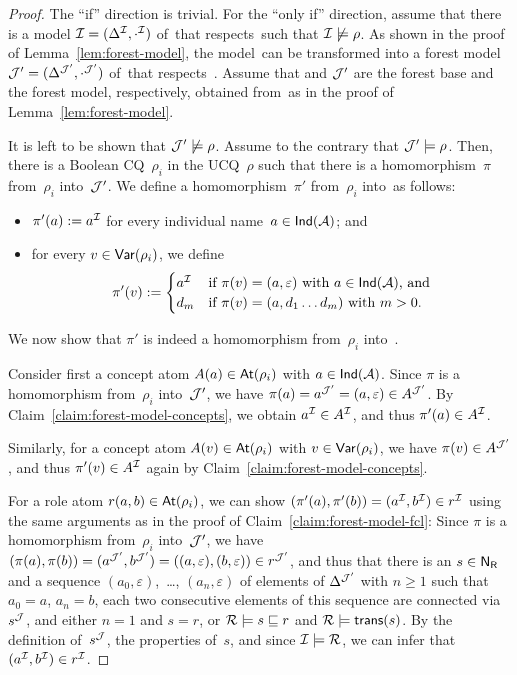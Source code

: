 \begin{proof}
    The \enquote{if} direction is trivial.  For the \enquote{only if} direction,
    assume that there is a model $\mathcal{I}=(\Delta^\mathcal{I},\cdot^\mathcal{I})$ of~\Kmc that
    respects~\Dmc such that $\mathcal{I}\not\models\rho$.  As shown in the proof of
    Lemma~\ref{lem:forest-model}, the model~\Imc can be transformed into a
    forest model $\mathcal{J}'=(\Delta^{\mathcal{J}'},\cdot^{\mathcal{J}'})$ of~\Kmc that
    respects~\Dmc.
    Assume that \Jmc and $\mathcal{J}'$ are the forest base and the forest model,
    respectively, obtained from~\Imc as in the proof of
    Lemma~\ref{lem:forest-model}.

    It is left to be shown that $\mathcal{J}'\not\models\rho$.  Assume to the contrary
    that $\mathcal{J}'\models\rho$.  Then, there is a Boolean CQ~$\rho_i$ in the
    UCQ~$\rho$ such that there is a homomorphism~$\pi$ from~$\rho_i$
    into~$\mathcal{J}'$.  We define a homomorphism~$\pi'$ from~$\rho_i$ into~\Imc as
    follows:
    \begin{itemize}
        \item $\pi'(a):=a^\mathcal{I}$ for every individual name~$a\in\mathsf{Ind}(\mathcal{A})$; and
        \item for every $v\in\operatorname{\mathsf{Var}}(\rho_i)$, we define
            \[\pi'(v):=\begin{cases}
                    a^\mathcal{I}
                    &\text{if $\pi(v)=(a,\varepsilon)$ with $a\in\mathsf{Ind}(\mathcal{A})$, and}\\
                    d_m
                    &\text{if $\pi(v)=(a,d_1\dots d_m)$ with $m>0$.}
                \end{cases}\]
    \end{itemize}
    We now show that $\pi'$ is indeed a homomorphism from~$\rho_i$ into~\Imc.

    Consider first a concept atom $A(a)\in\operatorname{\mathsf{At}}(\rho_i)$ with $a\in\mathsf{Ind}(\mathcal{A})$.
    Since $\pi$ is a homomorphism from~$\rho_i$ into~$\mathcal{J}'$, we have
    $\pi(a)=a^{\mathcal{J}'}=(a,\varepsilon)\in A^{\mathcal{J}'}$.  By
    Claim~\ref{claim:forest-model-concepts}, we obtain
    $a^\mathcal{I}\in A^\mathcal{I}$, and thus $\pi'(a)\in A^\mathcal{I}$.

    Similarly, for a concept atom $A(v)\in\operatorname{\mathsf{At}}(\rho_i)$ with $v\in\operatorname{\mathsf{Var}}(\rho_i)$,
    we have $\pi(v)\in A^{\mathcal{J}'}$, and thus $\pi'(v)\in A^\mathcal{I}$ again by
    Claim~\ref{claim:forest-model-concepts}.

    For a role atom $r(a,b)\in\operatorname{\mathsf{At}}(\rho_i)$, we can show
    $(\pi'(a),\pi'(b))=(a^\mathcal{I},b^\mathcal{I})\in r^\mathcal{I}$ using the same arguments as in
    the proof of Claim~\ref{claim:forest-model-fcl}: Since $\pi$ is a
    homomorphism from~$\rho_i$ into~$\mathcal{J}'$, we have
    $(\pi(a),\pi(b))=(a^{\mathcal{J}'},b^{\mathcal{J}'})=((a,\varepsilon),(b,\varepsilon))\in r^{\mathcal{J}'}$,
    and thus that there is an $s\in\mathsf{N_R}$ and a sequence
    $(a_0,\varepsilon)$,~\dots, $(a_n,\varepsilon)$ of elements of
    $\Delta^{\mathcal{J}'}$ with $n\ge 1$ such that $a_0=a$, $a_n=b$, each two
    consecutive elements of this sequence are connected via~$s^\mathcal{J}$, and either
    $n=1$ and $s=r$, or $\mathcal{R}\models s\sqsubseteq r$ and $\mathcal{R}\models\mathsf{trans}(s)$.
    By the definition of~$s^\mathcal{J}$, the properties of~$s$, and since
    $\mathcal{I}\models\mathcal{R}$, we can infer that $(a^\mathcal{I},b^\mathcal{I})\in r^\mathcal{I}$.


\end{proof}
